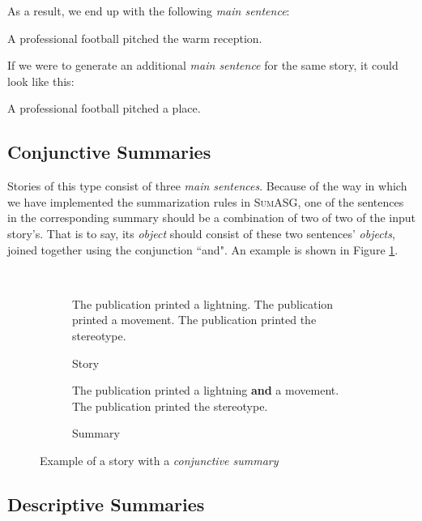 As a result, we end up with the following \textit{main sentence}:

\begin{displayquote}
A professional football pitched the warm reception.
\end{displayquote}

If we were to generate an additional \textit{main sentence} for the same story, it could look like this:

\begin{displayquote}
A professional football pitched a place.
\end{displayquote}

\subsection{Conjunctive Summaries}

Stories of this type consist of three \textit{main sentences}. Because of the way in which we have implemented the summarization rules in \textsc{SumASG}, one of the sentences in the corresponding summary should be a combination of two of two of the input story's. That is to say, its \textit{object} should consist of these two sentences' \textit{objects}, joined together using the conjunction ``and". An example is shown in Figure \ref{fig:conjunctive_summary_example}.

\begin{figure}[H]\
\begin{subfigure}{\textwidth}
\begin{displayquote}
The publication printed a lightning. The publication printed a movement. The publication printed the stereotype.
\end{displayquote}
\caption{Story}
\vspace{\baselineskip}
\end{subfigure}
\begin{subfigure}{\textwidth}
\begin{displayquote}
The publication printed a lightning \textbf{and} a movement. The publication printed the stereotype.
\end{displayquote}
\caption{Summary}
\end{subfigure}
\caption{Example of a story with a \textit{conjunctive summary}}
\label{fig:conjunctive_summary_example}
\end{figure}

\subsection{Descriptive Summaries}

